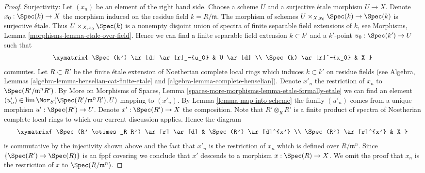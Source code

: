\begin{proof}
\medskip\noindent
Surjectivity: Let $(x_n)$ be an element of the right hand side.
Choose a scheme $U$ and a surjective \'etale morphism $U \to X$. 
Denote $x_0 : \Spec(k) \to X$ the morphism induced on the residue field
$k = R/\mathfrak m$. The morphism of schemes
$U \times_{X, x_0} \Spec(k) \to \Spec(k)$ is surjective \'etale.
Thus $U \times_{X, x_0} \Spec(k)$ is a nonempty disjoint union of spectra
of finite separable field extensions of $k$, see
Morphisms, Lemma \ref{morphisms-lemma-etale-over-field}.
Hence we can find a finite separable field extension $k \subset k'$
and a $k'$-point $u_0 : \Spec(k') \to U$ such that
$$
\xymatrix{
\Spec(k') \ar[d] \ar[r]_-{u_0} & U \ar[d] \\
\Spec(k) \ar[r]^-{x_0} & X
}
$$
commutes. Let $R \subset R'$ be the finite \'etale extension of Noetherian
complete local rings which induces $k \subset k'$ on residue fields
(see Algebra, Lemmas \ref{algebra-lemma-henselian-cat-finite-etale} and
\ref{algebra-lemma-complete-henselian}). Denote $x'_n$ the restriction
of $x_n$ to $\Spec(R'/\mathfrak m^nR')$. By
More on Morphisms of Spaces, Lemma
\ref{spaces-more-morphisms-lemma-etale-formally-etale}
we can find an element
$(u'_n) \in \lim \Mor_S(\Spec(R'/\mathfrak m^nR'), U)$
mapping to $(x'_n)$. By Lemma \ref{lemma-map-into-scheme}
the family $(u'_n)$ comes from a unique
morphism $u' : \Spec(R') \to U$. Denote $x' : \Spec(R') \to X$ the
composition. Note that $R' \otimes_R R'$ is a finite product of spectra of
Noetherian complete local rings to which our current discussion applies.
Hence the diagram
$$
\xymatrix{
\Spec(R' \otimes_R R') \ar[r] \ar[d] & \Spec(R') \ar[d]^{x'} \\
\Spec(R') \ar[r]^{x'} & X
}
$$
is commutative by the injectivity shown above and the fact that
$x'_n$ is the restriction of $x_n$ which is defined over $R/\mathfrak m^n$.
Since $\{\Spec(R') \to \Spec(R)\}$ is an fppf covering we conclude
that $x'$ descends to a morphism $x : \Spec(R) \to X$.
We omit the proof that $x_n$ is the restriction of $x$ to
$\Spec(R/\mathfrak m^n)$.
\end{proof}
















